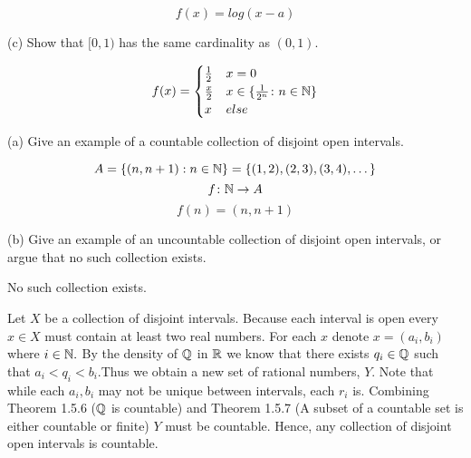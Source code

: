 \documentclass{report}
\begin{document}
\sol
$$
f(x)=log(x-a)
$$

\par \bigskip
(c) Show that $[0,1)$ has the same cardinality as $(0,1)$. 



\sol


$$ f(x) = 
  \begin{cases} 
    \frac{1}{2} & x= 0 \\
    \frac{x}{2} &  x \in \{ \frac{1}{2^n} \colon n \in \NN \} \\
    x & else
   \end{cases}
$$
\sol


 (a) Give an example of a countable collection of disjoint open intervals.
\par \bigskip

$$A=\{(n, n+1): n \in \NN\} = \{(1,2),(2,3),(3,4),\dots\}$$
$$
f \colon \NN \rightarrow A 
$$ $$ f(n)= (n, n+1)$$
\par \bigskip

 (b) Give an example of an uncountable collection of disjoint open intervals, or argue that no such collection exists.


No such collection exists.

\begin{myproof}
    
Let $X$ be a collection of disjoint intervals. Because each interval is open every $x \in X$ must contain at least two real numbers.  For each $x$ denote $x = (a_i, b_i)$ where $i \in \NN.$ By the density of $\QQ$ in $\RR$ we know that there exists $q_i \in \QQ$ such that $a_i < q_i < b_i.$Thus we obtain a new set of rational numbers, $Y$. Note that while each $a_i, b_i$ may not be unique between intervals, each $r_i$ is. Combining Theorem 1.5.6 ($\QQ$ is countable) and Theorem 1.5.7 (A subset of a countable set is either countable or finite) $Y$ must be countable. Hence, any collection of disjoint open intervals is countable.

\end{myproof}

\end{document}
